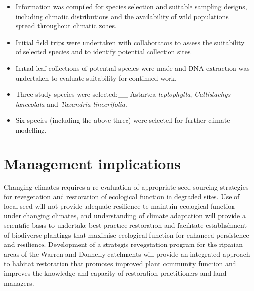 \documentclass[version=last, paper=a4, DIV=18, usenames, dvipsnames]{scrartcl}
\begin{document}
\begin{itemize}

  \item Information was compiled for species selection and suitable sampling designs, including climatic distributions and the availability of wild populations spread throughout climatic zones.

  \item Initial field trips were undertaken with collaborators to assess the suitability of selected species and to identify potential collection sites.

  \item Initial leaf collections of potential species were made and DNA extraction was undertaken to evaluate suitability for continued work.

  \item Three study species were selected:__ Astartea \emph{leptophylla}, \emph{Callistachys lanceolata} and \emph{Taxandria linearifolia}.

  \item Six species (including the above three) were selected for further climate modelling.

\end{itemize}






\section{Management implications}



Changing climates requires a re-evaluation of appropriate seed sourcing strategies for revegetation and restoration of ecological function in degraded sites. Use of local seed will not provide adequate resilience to maintain ecological function under changing climates, and understanding of climate adaptation will provide a scientific basis to undertake best-practice restoration and facilitate establishment of biodiverse plantings that maximise ecological function for enhanced persistence and resilience. Development of a strategic revegetation program for the riparian areas of the Warren and Donnelly catchments will provide an integrated approach to habitat restoration that promotes improved plant community function and improves the knowledge and capacity of restoration practitioners and land managers.
\end{document}
